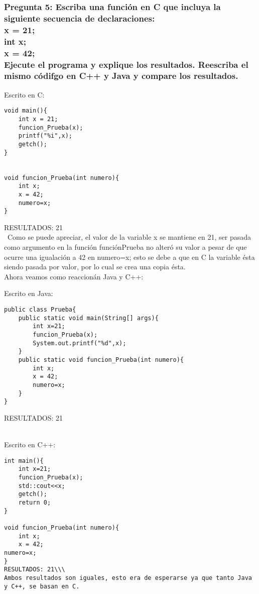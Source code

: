 \subsubsection{Pregunta 5:  Escriba una función en C que incluya la siguiente  secuencia de declaraciones:\\
x = 21;\\
int x;\\
x = 42;\\
Ejecute  el programa y explique los resultados. Reescriba el mismo códifgo en  C++
y Java y compare los resultados.}

Escrito en C:\\

\lstset{language = C} 
\begin{lstlisting}[frame = single] %Comienzo del Código
void main(){
	int x = 21;
	funcion_Prueba(x);
	printf("%i",x);
	getch();
}


void funcion_Prueba(int numero){
	int x;
	x = 42;
	numero=x;
}
\end{lstlisting}
RESULTADOS: 21\\\
Como se puede apreciar, el valor de la variable x se mantiene en 21, ser pasada como argumento en la función funciónPrueba no alteró su valor a pesar de que ocurre una igualación a 42 en numero=x; esto se debe a que en C la variable ésta siendo pasada por valor, por lo cual se crea una copia ésta.\\ 
Ahora veamos como reaccionán Java y C++:

Escrito en Java:\\
\lstset{language = Java}
\begin{lstlisting}[frame = single] %Comienzo del Código
public class Prueba{
	public static void main(String[] args){
		int x=21;
		funcion_Prueba(x);
		System.out.printf("%d",x);
	}
	public static void funcion_Prueba(int numero){
		int x;
		x = 42;
		numero=x;
	}
}
\end{lstlisting}

RESULTADOS: 21\\\


Escrito en C++:\\
\lstset{language = C++}
\begin{lstlisting}[frame = single] %Comienzo del Código
int main(){
	int x=21;
	funcion_Prueba(x);
	std::cout<<x;
	getch();
	return 0;
}

void funcion_Prueba(int numero){
	int x;
	x = 42;
numero=x;
}
RESULTADOS: 21\\\
Ambos resultados son iguales, esto era de esperarse ya que tanto Java y C++, se basan en C.
\end{lstlisting}

